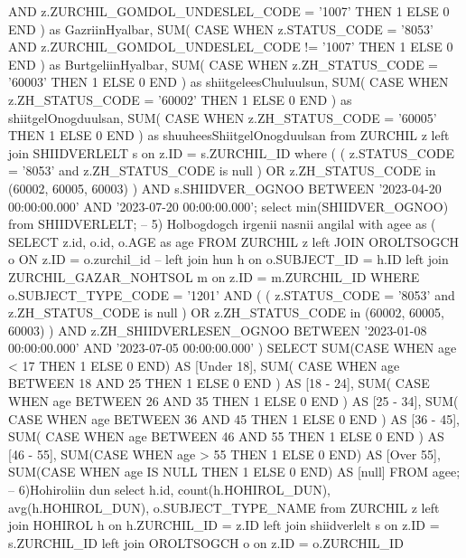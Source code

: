 \begin{mycode}[caption =, language = SQL]
        AND z.ZURCHIL_GOMDOL_UNDESLEL_CODE = '1007' THEN 1 ELSE 0 END
      ) as GazriinHyalbar, 
      SUM(
        CASE WHEN z.STATUS_CODE = '8053' 
        AND z.ZURCHIL_GOMDOL_UNDESLEL_CODE != '1007' THEN 1 ELSE 0 END
      ) as BurtgeliinHyalbar, 
      SUM(
        CASE WHEN z.ZH_STATUS_CODE = '60003' THEN 1 ELSE 0 END
      ) as shiitgeleesChuluulsun, 
      SUM(
        CASE WHEN z.ZH_STATUS_CODE = '60002' THEN 1 ELSE 0 END
      ) as shiitgelOnogduulsan, 
      SUM(
        CASE WHEN z.ZH_STATUS_CODE = '60005' THEN 1 ELSE 0 END
      ) as shuuheesShiitgelOnogduulsan 
    from 
      ZURCHIL z 
      left join SHIIDVERLELT s on z.ID = s.ZURCHIL_ID 
    where 
      (
        (
          z.STATUS_CODE = '8053' 
          and z.ZH_STATUS_CODE is null
        ) 
        OR z.ZH_STATUS_CODE in (60002, 60005, 60003)
      ) 
      AND s.SHIIDVER_OGNOO BETWEEN '2023-04-20 00:00:00.000' 
      AND '2023-07-20 00:00:00.000';
    select 
      min(SHIIDVER_OGNOO) 
    from 
      SHIIDVERLELT;
    -- 5) Holbogdogch irgenii nasnii angilal
    with agee as (
      SELECT 
        z.id, 
        o.id, 
        o.AGE as age 
      FROM 
        ZURCHIL z 
        left JOIN OROLTSOGCH o ON z.ID = o.zurchil_id --                        left join hun h on o.SUBJECT_ID = h.ID
        left join ZURCHIL_GAZAR_NOHTSOL m on z.ID = m.ZURCHIL_ID 
      WHERE 
        o.SUBJECT_TYPE_CODE = '1201' 
        AND (
          (
            z.STATUS_CODE = '8053' 
            and z.ZH_STATUS_CODE is null
          ) 
          OR z.ZH_STATUS_CODE in (60002, 60005, 60003)
        ) 
        AND z.ZH_SHIIDVERLESEN_OGNOO BETWEEN '2023-01-08 00:00:00.000' 
        AND '2023-07-05 00:00:00.000'
    ) 
    SELECT 
      SUM(CASE WHEN age < 17 THEN 1 ELSE 0 END) AS [Under 18], 
      SUM(
        CASE WHEN age BETWEEN 18 
        AND 25 THEN 1 ELSE 0 END
      ) AS [18 - 24], 
      SUM(
        CASE WHEN age BETWEEN 26 
        AND 35 THEN 1 ELSE 0 END
      ) AS [25 - 34], 
      SUM(
        CASE WHEN age BETWEEN 36 
        AND 45 THEN 1 ELSE 0 END
      ) AS [36 - 45], 
      SUM(
        CASE WHEN age BETWEEN 46 
        AND 55 THEN 1 ELSE 0 END
      ) AS [46 - 55], 
      SUM(CASE WHEN age > 55 THEN 1 ELSE 0 END) AS [Over 55], 
      SUM(CASE WHEN age IS NULL THEN 1 ELSE 0 END) AS [null] 
    FROM 
      agee;
    -- 6)Hohiroliin dun
    select 
      h.id, 
      count(h.HOHIROL_DUN), 
      avg(h.HOHIROL_DUN), 
      o.SUBJECT_TYPE_NAME 
    from 
      ZURCHIL z 
      left join HOHIROL h on h.ZURCHIL_ID = z.ID 
      left join shiidverlelt s on z.ID = s.ZURCHIL_ID 
      left join OROLTSOGCH o on z.ID = o.ZURCHIL_ID 

\end{mycode}
